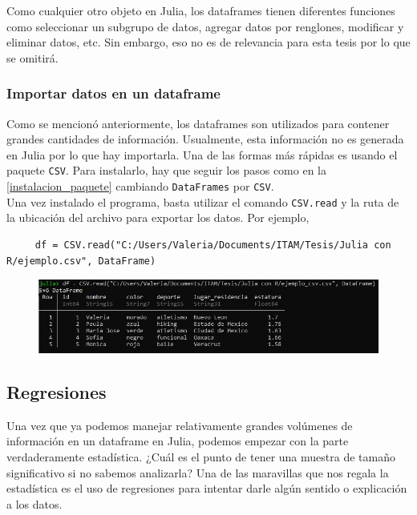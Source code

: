 Como cualquier otro objeto en Julia, los dataframes tienen diferentes funciones como seleccionar un subgrupo de datos, agregar datos por renglones, modificar y eliminar datos, etc. Sin embargo, eso no es de relevancia para esta tesis por lo que se omitirá. 

\subsubsection{Importar datos en un dataframe}

Como se mencionó anteriormente, los dataframes son utilizados para contener grandes cantidades de información. Usualmente, esta información no es generada en Julia por lo que hay importarla. Una de las formas más rápidas es usando el paquete \texttt{CSV}. Para instalarlo, hay que seguir los pasos como en la  \ref{instalacion_paquete} cambiando \texttt{DataFrames} por \texttt{CSV}. 
\\
Una vez instalado el programa, basta utilizar el comando \texttt{CSV.read} y la ruta de la ubicación del archivo para exportar los datos. Por ejemplo, 

\begin{verbatim}
     df = CSV.read("C:/Users/Valeria/Documents/ITAM/Tesis/Julia con R/ejemplo.csv", DataFrame)
\end{verbatim}

\begin{figure}[h]
\begin{center}
\includegraphics[scale=0.6]{Imagenes/insertar_df.JPG}
  \label{insertar_df}
\end{center}
\end{figure}





\subsection{Regresiones}

Una vez que ya podemos manejar relativamente grandes volúmenes de información en un dataframe en Julia, podemos empezar con la parte verdaderamente estadística. ¿Cuál es el punto de tener una muestra de tamaño significativo si no sabemos analizarla? Una de las maravillas que nos regala la estadística es el uso de regresiones para intentar darle algún sentido o explicación a los datos. 


